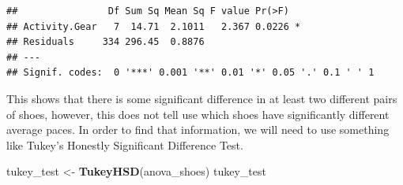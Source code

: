 \documentclass[]{article}
\newenvironment{Shaded}{\begin{snugshade}}{\end{snugshade}}
\newcommand{\KeywordTok}[1]{\textcolor[rgb]{0.13,0.29,0.53}{\textbf{#1}}}
\newcommand{\NormalTok}[1]{#1}
\newcommand{\StringTok}[1]{\textcolor[rgb]{0.31,0.60,0.02}{#1}}
\begin{document}
\begin{verbatim}
##                Df Sum Sq Mean Sq F value Pr(>F)  
## Activity.Gear   7  14.71  2.1011   2.367 0.0226 *
## Residuals     334 296.45  0.8876                 
## ---
## Signif. codes:  0 '***' 0.001 '**' 0.01 '*' 0.05 '.' 0.1 ' ' 1
\end{verbatim}

This shows that there is some significant difference in at least two
different pairs of shoes, however, this does not tell use which shoes
have significantly different average paces. In order to find that
information, we will need to use something like Tukey's Honestly
Significant Difference Test.

\begin{Shaded}
\begin{Highlighting}[]
\NormalTok{tukey_test <-}\StringTok{ }\KeywordTok{TukeyHSD}\NormalTok{(anova_shoes)}
\NormalTok{tukey_test}
\end{Highlighting}
\end{Shaded}
\end{document}
